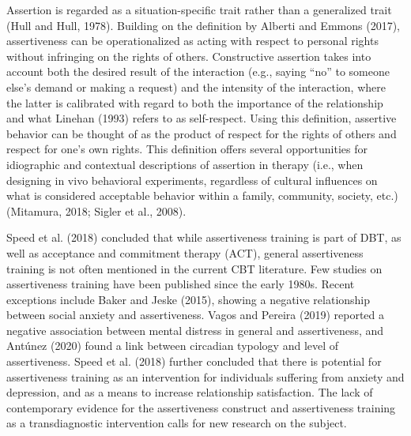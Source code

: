 \documentclass[preprint,
3p]{elsarticle} %
\begin{document}
Assertion is regarded as a situation-specific trait rather than a
generalized trait (Hull and Hull, 1978). Building on the definition by
Alberti and Emmons (2017), assertiveness can be operationalized as
acting with respect to personal rights without infringing on the rights
of others. Constructive assertion takes into account both the desired
result of the interaction (e.g., saying ``no'' to someone else's demand
or making a request) and the intensity of the interaction, where the
latter is calibrated with regard to both the importance of the
relationship and what Linehan (1993) refers to as self-respect. Using
this definition, assertive behavior can be thought of as the product of
respect for the rights of others and respect for one's own rights. This
definition offers several opportunities for idiographic and contextual
descriptions of assertion in therapy (i.e., when designing in vivo
behavioral experiments, regardless of cultural influences on what is
considered acceptable behavior within a family, community, society,
etc.) (Mitamura, 2018; Sigler et al., 2008).

Speed et al. (2018) concluded that while assertiveness training is part
of DBT, as well as acceptance and commitment therapy (ACT), general
assertiveness training is not often mentioned in the current CBT
literature. Few studies on assertiveness training have been published
since the early 1980s. Recent exceptions include Baker and Jeske (2015),
showing a negative relationship between social anxiety and
assertiveness. Vagos and Pereira (2019) reported a negative association
between mental distress in general and assertiveness, and Antúnez (2020)
found a link between circadian typology and level of assertiveness.
Speed et al. (2018) further concluded that there is potential for
assertiveness training as an intervention for individuals suffering from
anxiety and depression, and as a means to increase relationship
satisfaction. The lack of contemporary evidence for the assertiveness
construct and assertiveness training as a transdiagnostic intervention
calls for new research on the subject.
\end{document}
